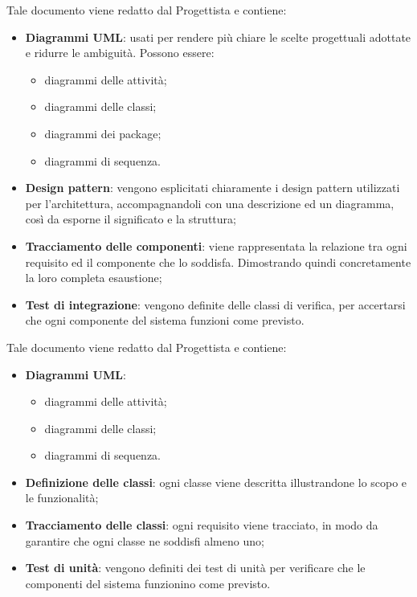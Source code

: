 	     Tale documento viene redatto dal Progettista e contiene:
	     \begin{itemize}
	     	\item{\textbf{Diagrammi UML}: usati per rendere più chiare le scelte progettuali adottate e ridurre le ambiguità. Possono essere:
                    \begin{itemize}
                    	\item{diagrammi delle attività;}
    			\item{diagrammi delle classi;}
    			\item{diagrammi dei package;}    			
			\item{diagrammi di sequenza.}                    
		\end{itemize}
}
		\item{\textbf{Design pattern}: vengono esplicitati chiaramente i design pattern utilizzati per l'architettura, accompagnandoli con una descrizione ed un diagramma, così da esporne il significato e la struttura;}
		\item{\textbf{Tracciamento delle componenti}: viene rappresentata la relazione tra ogni requisito ed il componente che lo soddisfa. Dimostrando quindi concretamente la loro completa esaustione;}
		\item{\textbf{Test di integrazione}: vengono definite delle classi di verifica, per accertarsi che ogni componente del sistema funzioni come previsto.}
	     \end{itemize}
	     
	     Tale documento viene redatto dal Progettista e contiene:
	     \begin{itemize}
	     	\item{\textbf{Diagrammi UML}:
			\begin{itemize}
				\item{diagrammi delle attività;}
    				\item{diagrammi delle classi;}
				\item{diagrammi di sequenza.}
			\end{itemize}
			}
		\item{\textbf{Definizione delle classi}: ogni classe viene descritta illustrandone lo scopo e le funzionalità;}
		\item{\textbf{Tracciamento delle classi}: ogni requisito viene tracciato, in modo da garantire che ogni classe ne soddisfi almeno uno;}
		\item{\textbf{Test di unità}: vengono definiti dei test di unità per verificare che le componenti del sistema funzionino come previsto.}
	     \end{itemize}
	     
